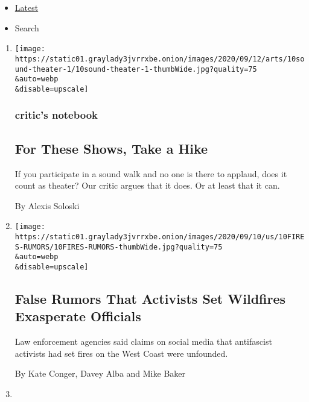 \begin{itemize}
\tightlist
\item
  \protect\hyperlink{stream-panel}{Latest}
\item
  Search
\end{itemize}

\begin{enumerate}
\def\labelenumi{\arabic{enumi}.}
\item
  \href{/2020/09/11/theater/sound-walks-promenade-plays.html}{}

  \texttt{[image: https://static01.graylady3jvrrxbe.onion/images/2020/09/12/arts/10sound-theater-1/10sound-theater-1-thumbWide.jpg?quality=75\\\&auto=webp\\\&disable=upscale]}

  \hypertarget{critics-notebook}{%
  \subsubsection{critic's notebook}\label{critics-notebook}}

  \hypertarget{for-these-shows-take-a-hike}{%
  \subsection{For These Shows, Take a
  Hike}\label{for-these-shows-take-a-hike}}

  If you participate in a sound walk and no one is there to applaud,
  does it count as theater? Our critic argues that it does. Or at least
  that it can.

  By Alexis Soloski
\item
  \href{/2020/09/10/us/antifa-wildfires.html}{}

  \texttt{[image: https://static01.graylady3jvrrxbe.onion/images/2020/09/10/us/10FIRES-RUMORS/10FIRES-RUMORS-thumbWide.jpg?quality=75\\\&auto=webp\\\&disable=upscale]}

  \hypertarget{false-rumors-that-activists-set-wildfires-exasperate-officials}{%
  \subsection{False Rumors That Activists Set Wildfires Exasperate
  Officials}\label{false-rumors-that-activists-set-wildfires-exasperate-officials}}

  Law enforcement agencies said claims on social media that antifascist
  activists had set fires on the West Coast were unfounded.

  By Kate Conger, Davey Alba and Mike Baker
\item
  \href{/2020/09/10/style/gender-reveal-parties-cursed.html}{}


\end{enumerate}
